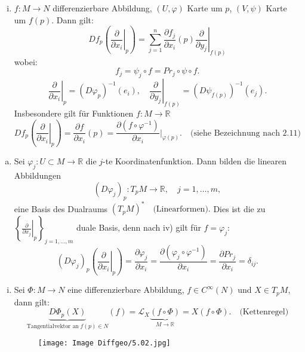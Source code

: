\documentclass[fleqn, 12pt, letterpaper]{article}
\newcommand{\deldel}[2]{\frac{\partial #1}{\partial #2}}
\newcommand{\txt}[1]{\text{#1}}
\begin{document}
\begin{enumerate}[iv)]
    \item \(f: M \to N\) differenzierbare Abbildung, \((U, \varphi)\) Karte um \(p\), \((V, \psi)\) Karte um \(f(p)\). Dann gilt:
\[
Df_p\left( \left. \frac{\partial}{\partial x_i} \right|_p \right)
= \sum_{j=1}^n \frac{\partial f_j}{\partial x_i}(p)
\left. \frac{\partial}{\partial y_j} \right|_{f(p)}
\]
    wobei:
    \[
    f_j = \psi_j \circ f = Pr_j \circ \psi \circ f.
    \]
    \[
    \left. \frac{\partial}{\partial x_i} \right|_p = (D\varphi_p)^{-1}(e_i), \quad \left. \frac{\partial}{\partial y_j} \right|_{f(p)} = (D\psi_{f(p)})^{-1}(e_j).
    \]
    Insbesondere gilt für Funktionen \(f: M \to \mathbb{R}\)
\[
Df_p\left( \left. \frac{\partial}{\partial x_i} \right|_p \right)
= \frac{\partial f}{\partial x_i}(p)
= \frac{\partial (f \circ \varphi^{-1})}{\partial x_i} \Big|_{\varphi(p)}.
\quad \text{(siehe Bezeichnung nach 2.11)}
\]

\end{enumerate}

\begin{enumerate}[v)]
    \item Sei \(\varphi_j : U\subset M \to \mathbb{R}\) die \(j\)-te Koordinatenfunktion. Dann bilden die linearen Abbildungen
    \[
    (D\varphi_j)_p : T_p M \to \mathbb{R}, \quad j=1,\dotsc,m,
    \]
    eine Basis des Dualraums \((T_p M)^*\quad \text{(Linearformen)}.\)
    Dies ist die zu
    \(\left\{ \left. \frac{\partial}{\partial x_j} \right|_p \right\}_{j=1,\dotsc,m}\) duale Basis, denn nach iv) gilt für \(f = \varphi_j\):
    \[
    (D\varphi_j)_p\left( \left. \frac{\partial}{\partial x_i} \right|_p \right) = \deldel{\varphi_j}{x_i} = \deldel{(\varphi_j \circ \varphi^{-1})}{x_i} = \deldel{Pr_j}{x_i} = \delta_{ij}.
    \]
\end{enumerate}   

\begin{enumerate}[vi)]
        \item Sei \(\Phi: M \to N\) eine differenzierbare Abbildung, \(f \in C^\infty(N)\) und \(X \in T_p M\), dann gilt:
    \[
    \underbrace{D\Phi_p(X)}_{\text{Tangentialvektor an}\; f(p) \in N }(f) = \mathcal{L}_X\underbrace{(f\circ\Phi)}_{M\longrightarrow \mathbb{R}} = X(f\circ\Phi).\quad \txt{(Kettenregel)}
    \]
      \begin{figure}[H]
    \centering
    \texttt{[image: Image Diffgeo/5.02.jpg]}
 \end{figure}
\end{enumerate}
\end{document}
